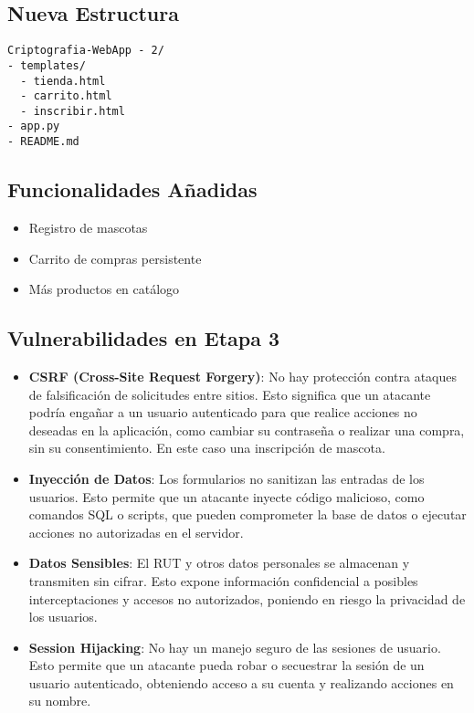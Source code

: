 \subsection{Nueva Estructura}
\begin{lstlisting}
Criptografia-WebApp - 2/
- templates/
  - tienda.html
  - carrito.html
  - inscribir.html
- app.py
- README.md
\end{lstlisting}

\subsection{Funcionalidades Añadidas}
\begin{itemize}
    \item Registro de mascotas
    \item Carrito de compras persistente
    \item Más productos en catálogo
\end{itemize}
\subsection{Vulnerabilidades en Etapa 3}
\begin{itemize}
    \item \textbf{CSRF (Cross-Site Request Forgery)}: No hay protección contra ataques de falsificación de solicitudes entre sitios. Esto significa que un atacante podría engañar a un usuario autenticado para que realice acciones no deseadas en la aplicación, como cambiar su contraseña o realizar una compra, sin su consentimiento. En este caso una inscripción de mascota.
    \item \textbf{Inyección de Datos}: Los formularios no sanitizan las entradas de los usuarios. Esto permite que un atacante inyecte código malicioso, como comandos SQL o scripts, que pueden comprometer la base de datos o ejecutar acciones no autorizadas en el servidor.
    \item \textbf{Datos Sensibles}: El RUT y otros datos personales se almacenan y transmiten sin cifrar. Esto expone información confidencial a posibles interceptaciones y accesos no autorizados, poniendo en riesgo la privacidad de los usuarios.
    \item \textbf{Session Hijacking}: No hay un manejo seguro de las sesiones de usuario. Esto permite que un atacante pueda robar o secuestrar la sesión de un usuario autenticado, obteniendo acceso a su cuenta y realizando acciones en su nombre.
\end{itemize}

